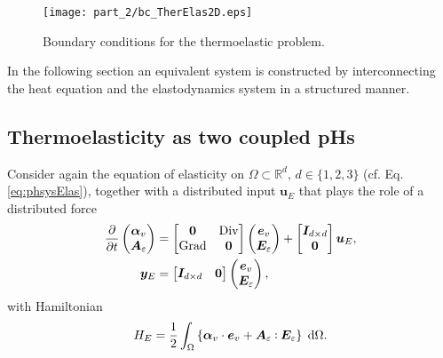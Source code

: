 \begin{figure}[tb]
	\centering
	\texttt{[image: part\_2/bc\_TherElas2D.eps]}
	\caption{Boundary conditions for the thermoelastic problem.}
	\label{fig:bc_TherElas2D}
\end{figure}
In the following section an equivalent system is constructed by interconnecting the heat equation and the elastodynamics system in a structured manner.

\subsection{Thermoelasticity as two coupled pHs}

Consider again the equation of elasticity on $\Omega \subset \mathbb{R}^d, \, d \in \{1, 2, 3\}$ (cf. Eq. \eqref{eq:phsysElas}), together with a distributed input $\bm{u}_E$ that plays the role of a distributed force
\begin{equation}
\begin{aligned}
\diffp{}{t}
\begin{pmatrix}
\bm{\alpha}_v \\
\bm{A}_{\varepsilon} \\
\end{pmatrix} &= 
\begin{bmatrix}
\bm{0} & \Div \\
\Grad & \bm{0} \\
\end{bmatrix}
\begin{pmatrix}
\bm{e}_v \\
\bm{E}_{\varepsilon} \\
\end{pmatrix} + 
\begin{bmatrix}
\bm{I}_{d\times d} \\
\bm{0} \\
\end{bmatrix}\bm{u}_E, \\
\bm{y}_E &= \begin{bmatrix}
\bm{I}_{d\times d} & \bm{0} \\
\end{bmatrix}
\begin{pmatrix}
\bm{e}_v \\
\bm{E}_{\varepsilon}
\end{pmatrix},
\end{aligned}
\end{equation}
with Hamiltonian  
\[
H_E = \energy{\bm{\alpha}_v \cdot \bm{e}_v + \bm{A}_{\varepsilon} \cddot \bm{E}_{\varepsilon}}.
\]
